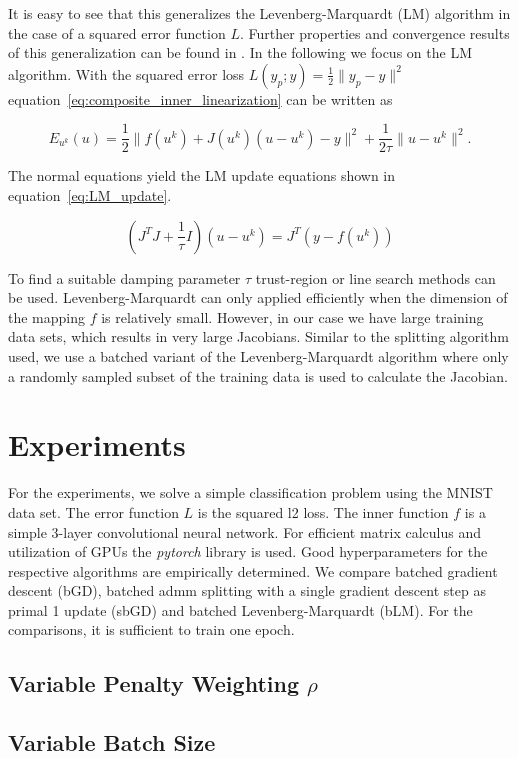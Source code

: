 \documentclass[english,11pt,a4paper]{article}
\begin{document}
It is easy to see that this generalizes the Levenberg-Marquardt (LM) algorithm in the case of a squared error function $L$. Further properties and convergence results of this generalization can be found in \cite{lewis2016proximal}. In the following we focus on the LM algorithm. With the squared error loss $L(y_p;y) = \frac{1}{2} \|y_p - y\|^2$ equation~\ref{eq:composite_inner_linearization} can be written as

\begin{equation}
	E_{u^k}(u) = \frac{1}{2} \|f(u^k) + J(u^k)(u - u^k) - y\|^2 + \frac{1}{2 \tau} \| u - u^k \|^2.
	\label{eq:linearized_ls}
\end{equation}

The normal equations yield the LM update equations shown in equation~\ref{eq:LM_update}.

\begin{equation}
	(J^T J + \frac{1}{\tau} I) (u - u^k) = J^T(y - f(u^k))
	\label{eq:LM_update}
\end{equation}

To find a suitable damping parameter $\tau$ trust-region or line search methods can be used. Levenberg-Marquardt can only applied efficiently when the dimension of the mapping $f$ is relatively small. However, in our case we have large training data sets, which results in very large Jacobians. Similar to the splitting algorithm used, we use a batched variant of the Levenberg-Marquardt algorithm where only a randomly sampled subset of the training data is used to calculate the Jacobian.

\section{Experiments}

For the experiments, we solve a simple classification problem using the MNIST data set. The error function $L$ is the squared l2 loss. The inner function $f$ is a simple 3-layer convolutional neural network. For efficient matrix calculus and utilization of GPUs the \textit{pytorch} library is used. Good hyperparameters for the respective algorithms are empirically determined. We compare batched gradient descent (bGD), batched admm splitting with a single gradient descent step as primal 1 update (sbGD) and batched Levenberg-Marquardt (bLM). For the comparisons, it is sufficient to train one epoch.

\subsection{Variable Penalty Weighting $\rho$}

\subsection{Variable Batch Size}


\pagebreak

\printbibliography
\end{document}

